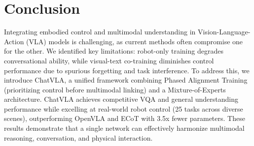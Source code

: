 \section{Conclusion}
Integrating embodied control and multimodal understanding in Vision-Language-Action (VLA) models is challenging, as current methods often compromise one for the other. We identified key limitations: robot-only training degrades conversational ability, while visual-text co-training diminishes control performance due to spurious forgetting and task interference. To address this, we introduce ChatVLA, a unified framework combining Phased Alignment Training (prioritizing control before multimodal linking) and a Mixture-of-Experts architecture. ChatVLA achieves competitive VQA and general understanding performance while excelling at real-world robot control (25 tasks across diverse scenes), outperforming OpenVLA and ECoT with 3.5x fewer parameters. These results demonstrate that a single network can effectively harmonize multimodal reasoning, conversation, and physical interaction.